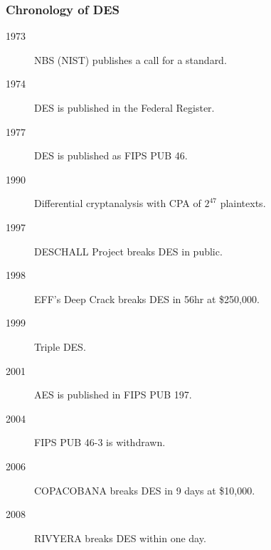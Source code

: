 \begin{comment}
\textbf{Idea}: The left/right half of the key affects the inputs only to the first/last four $S$-boxes. Brute-force needs $2\cdot 2^{28}$.
\end{columns}
\begin{itemize}
\item Check 16-bit XOR of outputs of four $S$-boxes on one half.
\item $2^{28}/2^{16}=2^{12}$ guesses on half-key pass check (with pr. $2^{-16}$).
\item Use another I/O pair to test $2^{12+12}$ keys (with exp. $2^{24-16\times 2}$).
\item Totally, $2\cdot 2^{28} + 2^{24} < 2^{30}$ time and $2\cdot 2^{12}$ space.
\end{itemize}
\end{frame}
\end{comment}
\begin{frame}\frametitle{Chronology of DES}
\begin{description}
\item[1973] NBS (NIST) publishes a call for a standard.
\item[1974] DES is published in the Federal Register.
\item[1977] DES is published as FIPS PUB 46.
\item[1990] Differential cryptanalysis with CPA of $2^{47}$ plaintexts. 
\item[1997] DESCHALL Project breaks DES in public.
\item[1998] EFF's Deep Crack breaks DES in 56hr at \$250,000.
\item[1999] Triple DES.
\item[2001] AES is published in FIPS PUB 197.
\item[2004] FIPS PUB 46-3 is withdrawn.
\item[2006] COPACOBANA breaks DES in 9 days at \$10,000.
\item[2008] RIVYERA breaks DES within one day.
\end{description}
\end{frame}
